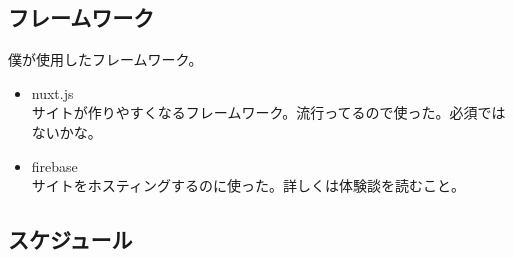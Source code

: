 \documentclass[dvipdfmx,jb5]{jarticle}
\begin{document}
 \subsection{フレームワーク}
 僕が使用したフレームワーク。
  \begin{itemize}
 \item nuxt.js\\
 サイトが作りやすくなるフレームワーク。流行ってるので使った。必須ではないかな。
 \item firebase\\
 サイトをホスティングするのに使った。詳しくは体験談を読むこと。
 \end{itemize}

 \subsection{スケジュール}
\end{document}
